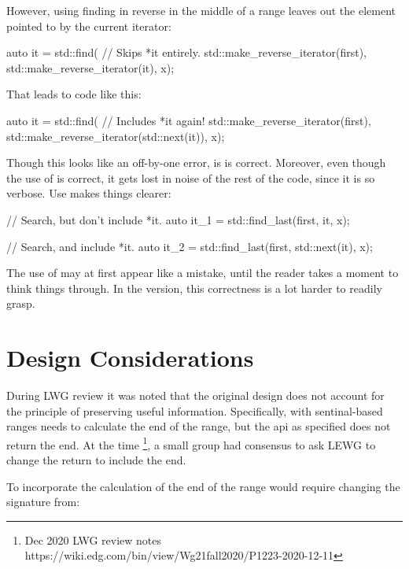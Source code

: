\documentclass[ebook,10pt,oneside,openany,final]{memoir}
\begin{document}
However, using finding in reverse in the middle of a range leaves out the
element pointed to by the current iterator:

\begin{itemdecl}
    auto it = std::find( // Skips *it entirely.
        std::make_reverse_iterator(first),
        std::make_reverse_iterator(it),
        x);
\end{itemdecl}

That leads to code like this:

\begin{itemdecl}
    auto it = std::find( // Includes *it again!
        std::make_reverse_iterator(first),
        std::make_reverse_iterator(std::next(it)),
        x);
\end{itemdecl}

Though this looks like an off-by-one error, is is correct.  Moreover, even
though the use of  is correct, it gets lost in noise of the rest
of the code, since it is so verbose.  Use  makes things
clearer:

\begin{itemdecl}
    // Search, but don't include *it.
    auto it_1 = std::find_last(first, it, x);

    // Search, and include *it.
    auto it_2 = std::find_last(first, std::next(it), x);
\end{itemdecl}

The use of  may at first appear like a mistake, until the reader
takes a moment to think things through.  In the 
version, this correctness is a lot harder to readily grasp.

\section{Design Considerations}

During LWG review it was noted that the original design does not account
for the principle of preserving useful information.  Specifically, with
sentinal-based ranges  needs to calculate the end of the
range, but the api as specified does not return the end. At the time
\footnote{Dec 2020 LWG review notes https://wiki.edg.com/bin/view/Wg21fall2020/P1223-2020-12-11},
a small group had consensus to ask LEWG to change the return to include the end.

To incorporate the calculation of the end of the range would require changing the
signature from:
\end{document}
